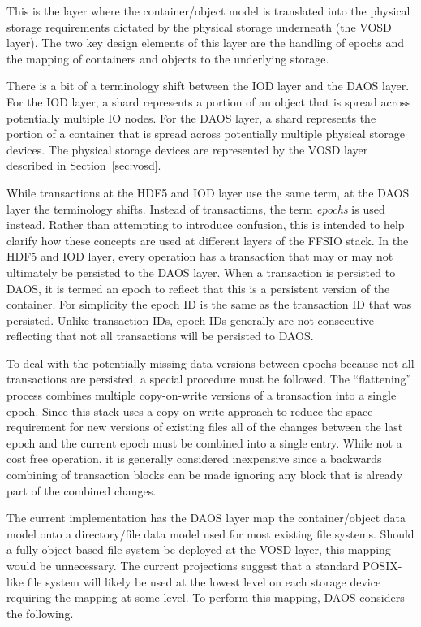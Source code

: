 \documentclass[conference]{IEEEtran} \pdfpagewidth=8.5in
\begin{document}
This is the layer where the container/object model is translated into the
physical storage requirements dictated by the physical storage underneath (the
VOSD layer). The two key design elements of this layer are the handling of
epochs and the mapping of containers and objects to the underlying storage.

There is a bit of a terminology shift between the IOD layer and the DAOS
layer. For the IOD layer, a shard represents a portion of an object that is
spread across potentially multiple IO nodes. For the DAOS layer, a shard
represents the portion of a container that is spread across potentially
multiple physical storage devices.  The physical storage devices are
represented by the VOSD layer described in Section~\ref{sec:vosd}.

While transactions at the HDF5 and IOD layer use the same term, at the DAOS
layer the terminology shifts. Instead of transactions, the term {\em epochs}
is used instead. Rather than attempting to introduce confusion, this is intended
to help clarify how these concepts are used at different layers of the FFSIO
stack. In the HDF5 and IOD layer, every operation has a transaction that may
or may not ultimately be persisted to the DAOS layer. When a transaction is
persisted to DAOS, it is termed an epoch to reflect that this is a persistent
version of the container. For simplicity the epoch ID is the same as the
transaction ID that was persisted. Unlike transaction IDs, epoch IDs generally
are not consecutive reflecting that not all transactions will be persisted to
DAOS.

To deal with the potentially missing data versions between epochs because not
all transactions are persisted, a special procedure must be followed. The
``flattening'' process combines multiple copy-on-write versions of a
transaction into a single epoch.  Since this stack uses a copy-on-write
approach to reduce the space requirement for new versions of existing files all
of the changes between the last epoch and the current epoch must be combined
into a single entry. While not a cost free operation, it is generally
considered inexpensive since a backwards combining of transaction blocks can
be made ignoring any block that is already part of the combined changes.

The current implementation has the DAOS layer map the container/object data
model onto a directory/file data model used for most existing file systems.
Should a fully object-based file system be deployed at the VOSD layer, this
mapping would be unnecessary. The current projections suggest that a standard
POSIX-like file system will likely be used at the lowest level on each storage
device requiring the mapping at some level. To perform this mapping, DAOS
considers the following.
\end{document}
